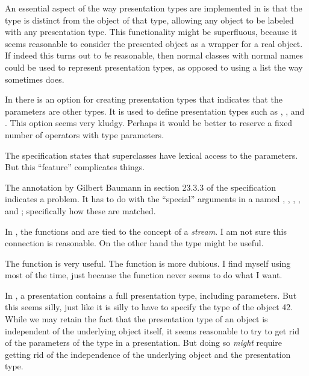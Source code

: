 An essential aspect of the way presentation types are implemented in
\climtwo{} is that the type is distinct from the object of that type,
allowing any \cl{} object to be labeled with any presentation type.
This functionality might be superfluous, because it seems reasonable
to consider the presented object as a wrapper for a real object.  If
indeed this turns out to \emph{be} reasonable, then normal \cl{}
classes with normal names could be used to represent presentation
types, as opposed to using a list the way \climtwo{} sometimes does.  

In \climtwo{} there is an option for creating presentation types that
indicates that the parameters are other types.  It is used to define
presentation types such as , , and
.  This option seems very kludgy.  Perhaps it would be
better to reserve a fixed number of operators with type parameters. 

The \climtwo{} specification states that superclasses have lexical
access to the parameters.  But this ``feature'' complicates things. 

The annotation by Gilbert Baumann in section 23.3.3 of the \climtwo{}
specification indicates a problem.  It has to do with the ``special''
arguments in a  named
, , , ,
and ; specifically how these are matched.  

In \climtwo{}, the functions  and  are tied
to the concept of a \climtwo{} \emph{stream}.  I am not sure this
connection is reasonable.  On the other hand the  type
might be useful. 

The \climtwo{} function  is very useful.  The function
 is more dubious.  I find myself using
 most of the time, just because the
function  never seems to do what I want. 

In \climtwo{}, a presentation contains a full presentation type,
including parameters.  But this seems silly, just like it is silly to
have to specify the type of the \cl{} object 42.  While we may retain
the fact that the presentation type of an object is independent of the
underlying object itself, it seems reasonable to try to get rid of the
parameters of the type in a presentation.  But doing so \emph{might}
require getting rid of the independence of the underlying object and
the presentation type.
